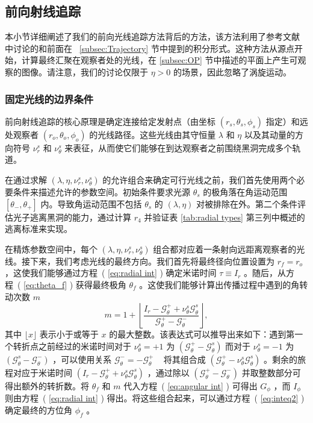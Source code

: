 \documentclass[aps,reprint,superscriptaddress,nofootinbib,floatfix,longbibliography,preprintnumbers]{revtex4-1}
\newcommand{\G}{\mathcal{G}}
\begin{document}
   \subsection{前向射线追踪  }    
   \label{subsec:frt}    本小节详细阐述了我们的前向光线追踪方法背后的方法，该方法利用了参考文献~    \cite{Gralla:2019ceu,Gralla:2019drh}    中讨论的和前面在~    \ref{subsec:Trajectory}    节中提到的积分形式。这种方法从源点开始，计算最终汇聚在观察者处的光线，在    \ref{subsec:OP}    节中描述的平面上产生可观察的图像。请注意，我们的讨论仅限于    $\eta > 0$    的场景，因此忽略了涡旋运动。  

   \subsubsection{固定光线的边界条件  }    
   \label{subsubsec:direction matching}     

前向射线追踪的核心原理是确定连接给定发射点（由坐标    $(r_s, \theta_s, \phi_s)$    指定）和远处观察者    $(r_o, \theta_o, \phi_o)$    的光线路径。这些光线由其守恒量    $\lambda$    和    $\eta$    以及其动量的方向符号    $\nu_r^s$    和    $\nu_{\theta}^s$    来表征，从而使它们能够在到达观察者之前围绕黑洞完成多个轨道。  

在通过求解    $(\lambda, \eta, \nu_r^s, \nu_{\theta}^s)$    的允许组合来确定可行光线之前，我们首先使用两个必要条件来描述允许的参数空间。初始条件要求光源    $\theta_s$    的极角落在角运动范围    $[\theta_-, \theta_+]$    内。导致角运动范围不包括    $\theta_s$    的    $(\lambda, \eta)$    对被排除在外。第二个条件评估光子逃离黑洞的能力，通过计算    $r_4$    并验证表    \ref{tab:radial types}    第三列中概述的逃离标准来实现。  

在精炼参数空间中，每个    $(\lambda, \eta, \nu_r^s, \nu_{\theta}^s)$    组合都对应着一条射向远距离观察者的光线。接下来，我们考虑光线的最终方向。我们首先将最终径向位置设置为    $r_f = r_o$    ，这使我们能够通过方程~(    \ref{eq:radial int}    ) 确定米诺时间    $\tau \equiv I_r$    。随后，从方程~(    \ref{eq:theta_f}    ) 获得最终极角    $\theta_f$    。这使我们能够计算出传播过程中遇到的角转动次数    $m$    
   \begin{equation}
m = 1 + \left\lfloor \frac{I_r - \G_{\theta}^{+} + \nu_{\theta}^s\G_{\theta}^s}{\G_{\theta}^+ - \G_{\theta}^-} \right\rfloor,
\label{eq:m}
\end{equation}    其中    $\lfloor x \rfloor$    表示小于或等于    $x$    的最大整数。该表达式可以推导出来如下：遇到第一个转折点之前经过的米诺时间对于    $\nu_{\theta}^s=+1$    为    $(\G_{\theta}^+-\G_{\theta}^s)$    而对于    $\nu_{\theta}^s=-1$    为    $(\G_{\theta}^s-\G_{\theta}^-)$    ，可以使用关系    $\G_{\theta}^- = -\G_{\theta}^+$    ~    \cite{Gralla:2019ceu}    将其组合成
   $(\G_{\theta}^{+} - \nu_{\theta}^s \G_{\theta}^s)$    。剩余的旅程对应于米诺时间    $(I_r - \G_{\theta}^{+} + \nu_{\theta}^s \G_{\theta}^s)$    ，通过除以    $(\G_{\theta}^+ - \G_{\theta}^-)$    并取整数部分可得出额外的转折数。将    $\theta_f$    和    $m$    代入方程~(    \ref{eq:angular int}    ) 可得出    $G_\phi$    ，而    $I_{\phi}$    则由方程~(    \ref{eq:radial int}    ) 得出。将这些组合起来，可以通过方程~(    \ref{eq:inteq2}    ) 确定最终的方位角    $\phi_f$    。  
\end{document}

